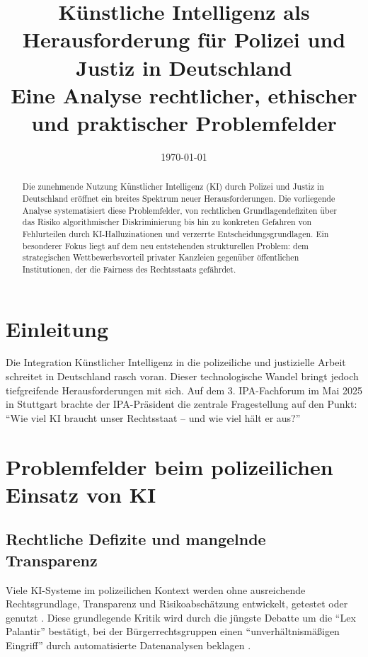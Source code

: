 \documentclass[12pt,a4paper]{article}
\title{Künstliche Intelligenz als Herausforderung für Polizei und Justiz in Deutschland\\
	\large Eine Analyse rechtlicher, ethischer und praktischer Problemfelder}
\author{}
\date{\today}
\begin{document}
	
	\maketitle
	
	\begin{abstract}
		Die zunehmende Nutzung Künstlicher Intelligenz (KI) durch Polizei und Justiz in Deutschland eröffnet ein breites Spektrum neuer Herausforderungen. Die vorliegende Analyse systematisiert diese Problemfelder, von rechtlichen Grundlagendefiziten über das Risiko algorithmischer Diskriminierung bis hin zu konkreten Gefahren von Fehlurteilen durch KI-Halluzinationen und verzerrte Entscheidungsgrundlagen. Ein besonderer Fokus liegt auf dem neu entstehenden strukturellen Problem: dem strategischen Wettbewerbsvorteil privater Kanzleien gegenüber öffentlichen Institutionen, der die Fairness des Rechtsstaats gefährdet.
	\end{abstract}
	
	\section{Einleitung}
	
	Die Integration Künstlicher Intelligenz in die polizeiliche und justizielle Arbeit schreitet in Deutschland rasch voran. Dieser technologische Wandel bringt jedoch tiefgreifende Herausforderungen mit sich. Auf dem 3. IPA-Fachforum im Mai 2025 in Stuttgart brachte der IPA-Präsident die zentrale Fragestellung auf den Punkt: \enquote{Wie viel KI braucht unser Rechtsstaat – und wie viel hält er aus?} \cite{IPA2025}
	
	\section{Problemfelder beim polizeilichen Einsatz von KI}
	
	\subsection{Rechtliche Defizite und mangelnde Transparenz}
	
	Viele KI-Systeme im polizeilichen Kontext werden ohne ausreichende Rechtsgrundlage, Transparenz und Risikoabschätzung entwickelt, getestet oder genutzt \cite{Peteranderl2025}. Diese grundlegende Kritik wird durch die jüngste Debatte um die \enquote{Lex Palantir} bestätigt, bei der Bürgerrechtsgruppen einen \enquote{unverhältnismäßigen Eingriff} durch automatisierte Datenanalysen beklagen \cite{FR2026}.
	
\end{document}
